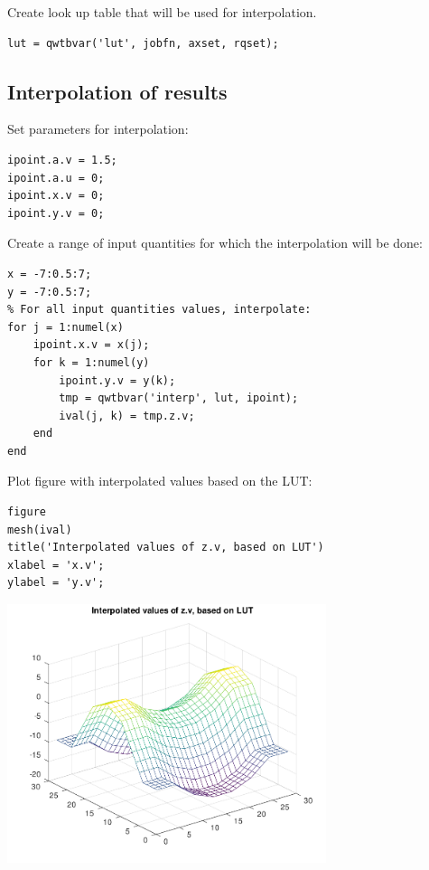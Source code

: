 Create look up table that will be used for interpolation.

\begin{lstlisting}
lut = qwtbvar('lut', jobfn, axset, rqset);
\end{lstlisting}


{}
\subsection*{Interpolation of results}



Set parameters for interpolation:

\begin{lstlisting}
ipoint.a.v = 1.5;
ipoint.a.u = 0;
ipoint.x.v = 0;
ipoint.y.v = 0;
\end{lstlisting}


Create a range of input quantities for which the interpolation will be done:

\begin{lstlisting}
x = -7:0.5:7;
y = -7:0.5:7;
% For all input quantities values, interpolate:
for j = 1:numel(x)
    ipoint.x.v = x(j);
    for k = 1:numel(y)
        ipoint.y.v = y(k);
        tmp = qwtbvar('interp', lut, ipoint);
        ival(j, k) = tmp.z.v;
    end
end
\end{lstlisting}


Plot figure with interpolated values based on the LUT:

\begin{lstlisting}
figure
mesh(ival)
title('Interpolated values of z.v, based on LUT')
xlabel = 'x.v';
ylabel = 'y.v';
\end{lstlisting}
\begin{center}
\includegraphics[width=0.7\textwidth]{qwtb_examples_published/qwtbvar_example_1-3.pdf}
\end{center}


\stopcontents[localtoc]
